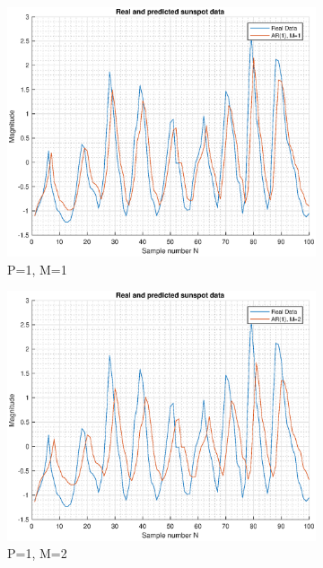 \documentclass{article}
\begin{document}
\begin{figure}[h!]
\centering
\begin{subfigure}{0.24\textwidth}
\centering
\includegraphics[width = \textwidth]{ar_mod1_hor1}
\caption{P=1, M=1}
\label{fig:ar_mod1_hor1}
\end{subfigure}
\begin{subfigure}{0.24\textwidth}
\centering
\includegraphics[width = \textwidth]{ar_mod1_hor2}
\caption{P=1, M=2}
\label{fig:ar_mod1_hor2}
\end{subfigure}
\begin{subfigure}{0.24\textwidth}

\end{subfigure}
\end{figure}
\end{document}
